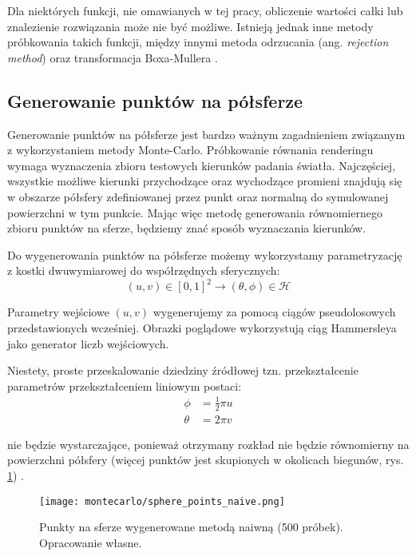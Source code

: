 \documentclass[../main.tex]{subfiles}
\begin{document}
Dla niektórych funkcji, nie omawianych w tej pracy, obliczenie wartości całki lub znalezienie rozwiązania może nie być możliwe. Istnieją jednak inne metody próbkowania takich funkcji, między innymi metoda odrzucania (ang. \textit{rejection method}) oraz transformacja Boxa-Mullera \cite{pbrt}.

\subsection{Generowanie punktów na półsferze}

Generowanie punktów na półsferze jest bardzo ważnym zagadnieniem związanym z wykorzystaniem metody Monte-Carlo. Próbkowanie równania renderingu wymaga wyznaczenia zbioru testowych kierunków padania światła. Najczęściej, wszystkie możliwe kierunki przychodzące oraz wychodzące promieni znajdują się w obszarze półsfery zdefiniowanej przez punkt oraz normalną do symulowanej powierzchni w tym punkcie. Mając więc metodę generowania równomiernego zbioru punktów na sferze, będziemy znać sposób wyznaczania kierunków.

Do wygenerowania punktów na półsferze możemy wykorzystamy parametryzację z kostki dwuwymiarowej do współrzędnych sferycznych:
\begin{equation}
  (u,v) \in [0,1]^2 \rightarrow (\theta, \phi) \in \mathcal{H}
\end{equation}

Parametry wejściowe $(u,v)$ wygenerujemy za pomocą ciągów pseudolosowych przedstawionych wcześniej. Obrazki poglądowe wykorzystują ciąg Hammersleya jako generator liczb wejściowych.

Niestety, proste przeskalowanie dziedziny źródłowej tzn. przekształcenie parametrów przekształceniem liniowym postaci:
\begin{equation}	
\begin{aligned}
    \phi &= \frac{1}{2} \pi u \\
    \theta &= 2 \pi v
\end{aligned}
\end{equation}

\noindent nie będzie wystarczające, ponieważ otrzymany rozkład nie będzie równomierny na powierzchni półsfery (więcej punktów jest skupionych w okolicach biegunów, rys. \ref{fig:SpherePointsNaive}) \cite{WolframSpherePointPicking}.

\begin{figure}[h]
    \centering
    \texttt{[image: montecarlo/sphere\_points\_naive.png]}
    \caption{Punkty na sferze wygenerowane metodą naiwną (500 próbek). Opracowanie własne.}
    \label{fig:SpherePointsNaive}
\end{figure}
\end{document}
